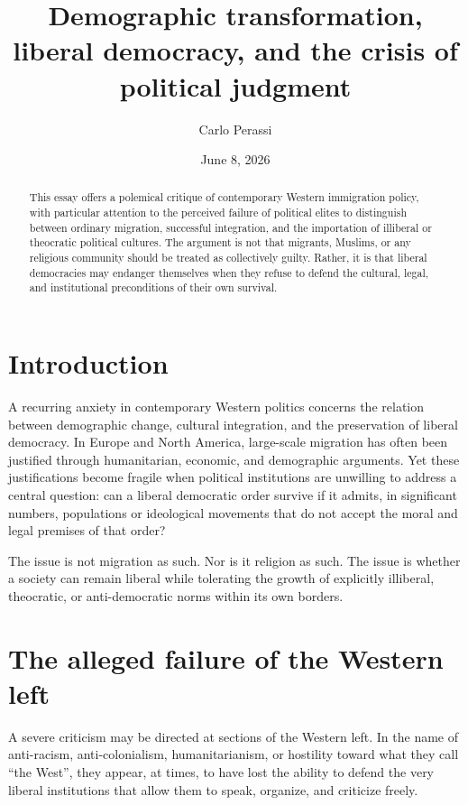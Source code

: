 \documentclass[11pt]{article}
\title{Demographic transformation, liberal democracy, and the crisis of political judgment}
\author{Carlo Perassi}
\date{June 8, 2026}
\begin{document}
\maketitle

\begin{abstract}
This essay offers a polemical critique of contemporary Western immigration policy, with particular attention to the perceived failure of political elites to distinguish between ordinary migration, successful integration, and the importation of illiberal or theocratic political cultures. The argument is not that migrants, Muslims, or any religious community should be treated as collectively guilty. Rather, it is that liberal democracies may endanger themselves when they refuse to defend the cultural, legal, and institutional preconditions of their own survival.
\end{abstract}


\section{Introduction}

A recurring anxiety in contemporary Western politics concerns the relation between demographic change, cultural integration, and the preservation of liberal democracy. In Europe and North America, large-scale migration has often been justified through humanitarian, economic, and demographic arguments. Yet these justifications become fragile when political institutions are unwilling to address a central question: can a liberal democratic order survive if it admits, in significant numbers, populations or ideological movements that do not accept the moral and legal premises of that order?

The issue is not migration as such. Nor is it religion as such. The issue is whether a society can remain liberal while tolerating the growth of explicitly illiberal, theocratic, or anti-democratic norms within its own borders.

\section{The alleged failure of the Western left}

A severe criticism may be directed at sections of the Western left. In the name of anti-racism, anti-colonialism, humanitarianism, or hostility toward what they call ``the West'', they appear, at times, to have lost the ability to defend the very liberal institutions that allow them to speak, organize, and criticize freely.
\end{document}
